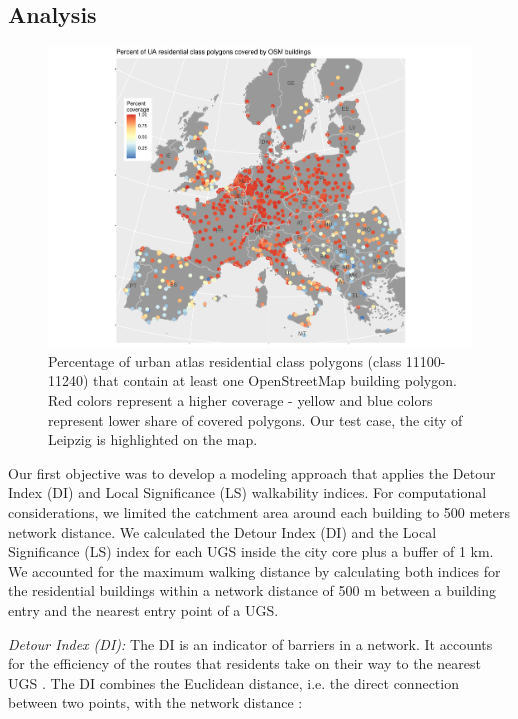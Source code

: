 \documentclass[10pt]{article}
\begin{document}
\subsection{Analysis}
\begin{figure}[t!]
\centering
\includegraphics[width=1\textwidth]{2-1_osm_coverage.pdf}
\caption{Percentage of urban atlas residential class polygons (class 11100-11240) that contain at least one OpenStreetMap building polygon. Red colors represent a higher coverage - yellow and blue colors represent lower share of covered polygons. Our test case, the city of Leipzig is highlighted on the map.}
\label{fig:osmcov}
\end{figure}

Our first objective was to develop a modeling approach that applies the Detour Index (DI) and Local Significance (LS) walkability indices.
For computational considerations, we limited the catchment area around each building to 500 meters network distance.
We calculated the Detour Index (DI) and the Local Significance (LS) index for each UGS inside the city core plus a buffer of 1 km.
We accounted for the maximum walking distance by calculating both indices for the residential buildings within a network distance of 500 m between a building entry and the nearest entry point of a UGS.

\textit{Detour Index (DI):}  The DI is an indicator of barriers in a network.
It accounts for the efficiency of the routes that residents take on their way to the nearest UGS \citep{Wolff.2021}. The DI combines the Euclidean distance, i.e. the direct connection between two points, with the network distance \citep{Esch.2014}:
\end{document}

